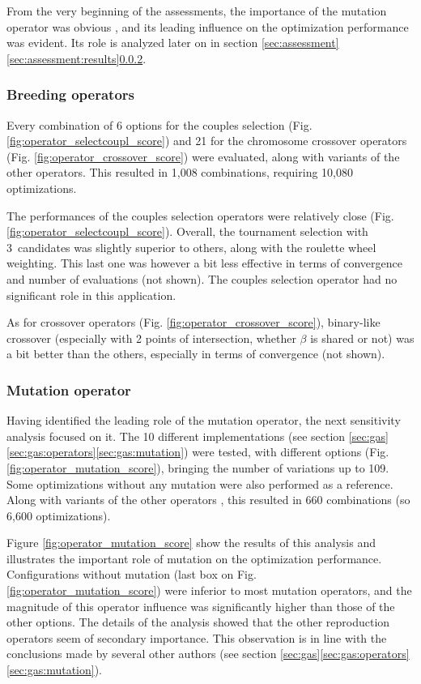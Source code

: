 \documentclass{ametsoc}
\begin{document}
From the very beginning of the assessments, the importance of the mutation operator was obvious \cite[see][for the details]{Horton2012a}, and its leading influence on the optimization performance was evident. Its role is analyzed later on in section \ref{sec:assessment}\ref{sec:assessment:results}\ref{sec:assessment:mutation}.

\subsubsection{Breeding operators}

Every combination of 6 options for the couples selection (Fig. \ref{fig:operator_selectcoupl_score}) and 21 for the chromosome crossover operators (Fig. \ref{fig:operator_crossover_score}) were evaluated, along with variants of the other operators. This resulted in 1,008 combinations, requiring 10,080 optimizations.

The performances of the couples selection operators were relatively close (Fig. \ref{fig:operator_selectcoupl_score}). Overall, the tournament selection with 3~candidates was slightly superior to others, along with the roulette wheel weighting. This last one was however a bit less effective in terms of convergence and number of evaluations (not shown). The couples selection operator had no significant role in this application. 

As for crossover operators (Fig. \ref{fig:operator_crossover_score}), binary-like crossover (especially with 2 points of intersection, whether $\beta$ is shared or not) was a bit better than the others, especially in terms of convergence (not shown).
	

\subsubsection{Mutation operator}
\label{sec:assessment:mutation}

Having identified the leading role of the mutation operator, the next sensitivity analysis focused on it. The 10 different implementations (see section \ref{sec:gas}\ref{sec:gas:operators}\ref{sec:gas:mutation}) were tested, with different options (Fig. \ref{fig:operator_mutation_score}), bringing the number of variations up to 109. Some optimizations without any mutation were also performed as a reference. Along with variants of the other operators \citep[see][for the details]{Horton2012a}, this resulted in 660 combinations (so 6,600 optimizations).

Figure \ref{fig:operator_mutation_score} show the results of this analysis and illustrates the important role of mutation on the optimization performance. Configurations without mutation (last box on Fig. \ref{fig:operator_mutation_score}) were inferior to most mutation operators, and the magnitude of this operator influence was significantly higher than those of the other options. The details of the analysis \citep[see][]{Horton2012a} showed that the other reproduction operators seem of secondary importance. This observation is in line with the conclusions made by several other authors (see section \ref{sec:gas}\ref{sec:gas:operators}\ref{sec:gas:mutation}).
\end{document}

